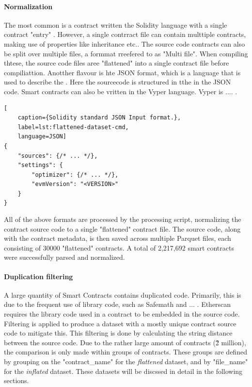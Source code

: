 \paragraph{Normalization}
The most common is a contract written the Solidity language with  a single contract "entry"  . However, a single contrract file can contain multtiple contracts, making use of properties like inheritance etc.. The source code contracts can also be split over multiple files, a formmat rreefered to as "Multi file". When compiling thtese, the source code files aree "flattened" into a single contract file before compiliattion. Anotther flavour is hte JSON format, which is a language that is used to describe the . Here the sourcecode is structured in tthe in the JSON code. Smart contracts can also be vritten in the Vyper language. Vyper is .... .


\begin{lstlisting}[
    caption={Solidity standard JSON Input format.},
    label=lst:flattened-dataset-cmd,
    language=JSON]
{
    "sources": {/* ... */},
    "settings": {
        "optimizer": {/* ... */},
        "evmVersion": "<VERSION>"
    }
}
\end{lstlisting}

All of the above formats are processed by the processing script, normalizing the contract source code to a single "flattened" contract file. The source code, along with the contract metadata, is then saved across multiple Parquet files, each consisting of 30000 "flattened" contracts. A total of 2,217,692 smart contracts were successfully parsed and normalized.

\paragraph{Duplication filtering}
\label{sec:duplication-filtering}
A large quantity of Smart Contracts contains duplicated code. Primarily, this is due to the frequent use of library code, such as Safemath and ... . Etherscan requires the library code used in a contract to be embedded in the source code. Filtering is applied to produce a dataset with a mostly unique contract source code to mitigate this. This filtering is done by calculating the string distance between the source code. Due to the rather large amount of contracts (\~2 million), the comparison is only made within groups of contracts. These groups are defined by grouping on the "contract\_name" for the \textit{flattened} dataset, and by "file\_name" for the \textit{inflated} dataset. These datasets will be discssed in detail in the following sections.

